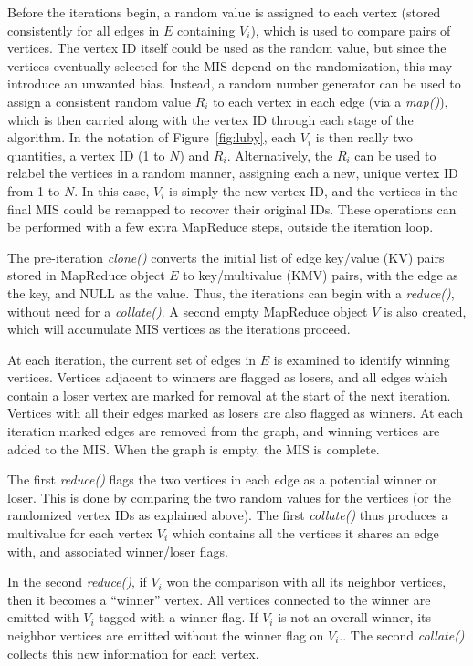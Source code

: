 Before the iterations begin, a random value is assigned to each vertex
(stored consistently for all edges in $E$ containing $V_i$), which is
used to compare pairs of vertices.  The vertex ID itself could be used
as the random value, but since the vertices eventually selected for
the MIS depend on the randomization, this may introduce an unwanted
bias.  Instead, a random number generator can be used to assign a
consistent random value $R_i$ to each vertex in each edge (via a {\it
map()}), which is then carried along with the vertex ID through each
stage of the algorithm.  In the notation of Figure~\ref{fig:luby},
each $V_i$ is then really two quantities, a vertex ID (1 to $N$) and
$R_i$.  Alternatively, the $R_i$ can be used to relabel the vertices
in a random manner, assigning each a new, unique vertex ID from 1 to
$N$.  In this case, $V_i$ is simply the new vertex ID, and the
vertices in the final MIS could be remapped to recover their original
IDs.  These operations can be performed with a few extra MapReduce
steps, outside the iteration loop.

The pre-iteration {\it clone()} converts the initial list of edge
key/value (KV) pairs stored in MapReduce object $E$ to key/multivalue
(KMV) pairs, with the edge as the key, and NULL as the value.  Thus,
the iterations can begin with a {\it reduce()}, without need for a
{\it collate()}.  A second empty MapReduce object $V$ is also created,
which will accumulate MIS vertices as the iterations proceed.

At each iteration, the current set of edges in $E$ is examined to
identify winning vertices.  Vertices adjacent to winners are flagged
as losers, and all edges which contain a loser vertex are marked for
removal at the start of the next iteration.  Vertices with all their
edges marked as losers are also flagged as winners.  At each iteration
marked edges are removed from the graph, and winning vertices are
added to the MIS.  When the graph is empty, the MIS is complete.

The first {\it reduce()} flags the two vertices in each edge as a
potential winner or loser.  This is done by comparing the two random
values for the vertices (or the randomized vertex IDs as explained
above).  The first {\it collate()} thus produces a multivalue for each
vertex $V_i$ which contains all the vertices it shares an edge with,
and associated winner/loser flags.

In the second {\it reduce()}, if $V_i$ won the comparison with all its
neighbor vertices, then it becomes a ``winner'' vertex.  All vertices
connected to the winner are emitted with $V_i$ tagged with a winner
flag.  If $V_i$ is not an overall winner, its neighbor vertices are
emitted without the winner flag on $V_i$..  The second {\it collate()}
collects this new information for each vertex.

